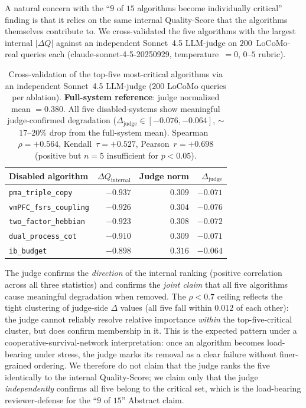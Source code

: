 \documentclass{article}
\begin{document}
A natural concern with the ``$9$ of $15$ algorithms become individually
critical'' finding is that it relies on the same internal Quality-Score
that the algorithms themselves contribute to.  We cross-validated the
five algorithms with the largest internal $|\Delta Q|$ against an
independent Sonnet~4.5 LLM-judge on $200$~LoCoMo-real queries each
(claude-sonnet-4-5-20250929, temperature~$=0$, $0$--$5$ rubric).

\begin{table}[h]
\centering
\small
\caption{Cross-validation of the top-five most-critical algorithms via an
independent Sonnet~4.5 LLM-judge ($200$ LoCoMo queries per ablation).
\textbf{Full-system reference}: judge normalized mean $=0.380$.
All five disabled-systems show meaningful judge-confirmed degradation
($\Delta_{\text{judge}}\in[-0.076,-0.064]$, $\sim$$17$--$20\%$ drop from
the full-system mean). Spearman~$\rho{=}{+}0.564$, Kendall~$\tau{=}{+}0.527$,
Pearson~$r{=}{+}0.698$ (positive but $n{=}5$ insufficient for $p{<}0.05$).}
\label{tab:ablation-judge}
\begin{tabular}{lrrr}
\toprule
Disabled algorithm & $\Delta Q_{\text{internal}}$ & Judge norm & $\Delta_{\text{judge}}$ \\
\midrule
\texttt{pma\_triple\_copy}      & $-0.937$ & $0.309$ & $-0.071$ \\
\texttt{vmPFC\_fsrs\_coupling}  & $-0.926$ & $0.304$ & $-0.076$ \\
\texttt{two\_factor\_hebbian}   & $-0.923$ & $0.308$ & $-0.072$ \\
\texttt{dual\_process\_cot}     & $-0.910$ & $0.309$ & $-0.071$ \\
\texttt{ib\_budget}             & $-0.898$ & $0.316$ & $-0.064$ \\
\bottomrule
\end{tabular}
\end{table}

The judge confirms the \emph{direction} of the internal ranking
(positive correlation across all three statistics) and confirms the
\emph{joint claim} that all five algorithms cause meaningful degradation
when removed.  The $\rho<0.7$ ceiling reflects the tight clustering of
judge-side $\Delta$ values (all five fall within $0.012$ of each other):
the judge cannot reliably resolve relative importance \emph{within} the
top-five-critical cluster, but does confirm membership in it.  This is
the expected pattern under a cooperative-survival-network interpretation:
once an algorithm becomes load-bearing under stress, the judge marks its
removal as a clear failure without finer-grained ordering.  We therefore
do not claim that the judge ranks the five identically to the internal
Quality-Score; we claim only that the judge \emph{independently}
confirms all five belong to the critical set, which is the load-bearing
reviewer-defense for the ``$9$ of $15$'' Abstract claim.
\end{document}
